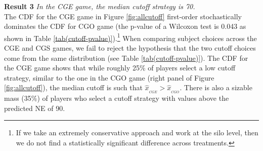 \documentclass[12pt, letterpaper]{article}
\theoremstyle{plain}
\begin{document}
\noindent \textbf{Result 3}
\textit{In the CGE game, the median cutoff strategy is 70.}\\

The CDF for the CGE game in Figure \ref{fig:allcutoff} first-order stochastically dominates the CDF for CGO game (the p-value of a Wilcoxon test is 0.043 as shown in Table \ref{tab(cutoff-pvalue)}).\footnote{If we take an extremely conservative approach and work at the silo level, then we do not find a statistically significant difference across treatments.} When comparing subject choices across the CGE and CGS games, we fail to reject the hypothesis that the two cutoff choices come from the same distribution (see Table \ref{tab(cutoff-pvalue)}). The CDF for the CGE game shows that while roughly 25\% of players select a low cutoff strategy,  similar to the one in the CGO game (right panel of Figure \ref{fig:allcutoff}), the median cutoff is such that $\hat{x}_{_{CGE}}> \hat{x}_{_{CGO}}$. There is also a sizable mass (35\%) of players who select a cutoff strategy with values above the predicted NE of 90.
\end{document}
